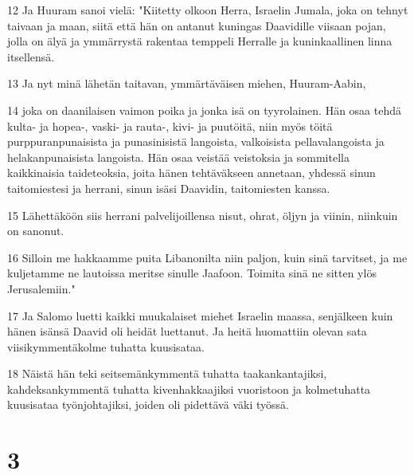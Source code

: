 \par 12 Ja Huuram sanoi vielä: "Kiitetty olkoon Herra, Israelin Jumala, joka on tehnyt taivaan ja maan, siitä että hän on antanut kuningas Daavidille viisaan pojan, jolla on älyä ja ymmärrystä rakentaa temppeli Herralle ja kuninkaallinen linna itsellensä.
\par 13 Ja nyt minä lähetän taitavan, ymmärtäväisen miehen, Huuram-Aabin,
\par 14 joka on daanilaisen vaimon poika ja jonka isä on tyyrolainen. Hän osaa tehdä kulta- ja hopea-, vaski- ja rauta-, kivi- ja puutöitä, niin myös töitä purppuranpunaisista ja punasinisistä langoista, valkoisista pellavalangoista ja helakanpunaisista langoista. Hän osaa veistää veistoksia ja sommitella kaikkinaisia taideteoksia, joita hänen tehtäväkseen annetaan, yhdessä sinun taitomiestesi ja herrani, sinun isäsi Daavidin, taitomiesten kanssa.
\par 15 Lähettäköön siis herrani palvelijoillensa nisut, ohrat, öljyn ja viinin, niinkuin on sanonut.
\par 16 Silloin me hakkaamme puita Libanonilta niin paljon, kuin sinä tarvitset, ja me kuljetamme ne lautoissa meritse sinulle Jaafoon. Toimita sinä ne sitten ylös Jerusalemiin."
\par 17 Ja Salomo luetti kaikki muukalaiset miehet Israelin maassa, senjälkeen kuin hänen isänsä Daavid oli heidät luettanut. Ja heitä huomattiin olevan sata viisikymmentäkolme tuhatta kuusisataa.
\par 18 Näistä hän teki seitsemänkymmentä tuhatta taakankantajiksi, kahdeksankymmentä tuhatta kivenhakkaajiksi vuoristoon ja kolmetuhatta kuusisataa työnjohtajiksi, joiden oli pidettävä väki työssä.

\chapter{3}

